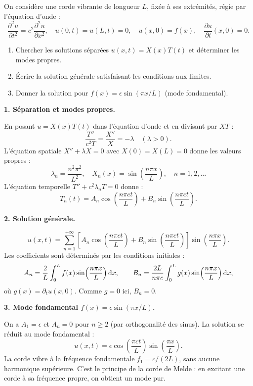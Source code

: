 \documentclass[12pt,a4paper]{article}
\begin{document}
\begin{boiteexercice}
On considère une corde vibrante de longueur $L$, fixée à ses extrémités, régie par l'équation d'onde :
\[
\frac{\partial^2 u}{\partial t^2} = c^2 \frac{\partial^2 u}{\partial x^2}, \quad u(0,t) = u(L,t) = 0, \quad u(x,0) = f(x), \quad \frac{\partial u}{\partial t}(x,0) = 0.
\]
\begin{enumerate}
  \item Chercher les solutions séparées $u(x,t) = X(x)T(t)$ et déterminer les modes propres.
  \item Écrire la solution générale satisfaisant les conditions aux limites.
  \item Donner la solution pour $f(x) = \epsilon\sin(\pi x/L)$ (mode fondamental).
\end{enumerate}
\end{boiteexercice}

\begin{boitecorrige}

\textbf{1. Séparation et modes propres.}

En posant $u = X(x)T(t)$ dans l'équation d'onde et en divisant par $XT$ :
\[
\frac{T''}{c^2 T} = \frac{X''}{X} = -\lambda \quad (\lambda > 0).
\]
L'équation spatiale $X'' + \lambda X = 0$ avec $X(0) = X(L) = 0$ donne les valeurs propres :
\[
\lambda_n = \frac{n^2\pi^2}{L^2}, \quad X_n(x) = \sin\!\left(\frac{n\pi x}{L}\right), \quad n=1,2,\ldots
\]
L'équation temporelle $T'' + c^2\lambda_n T = 0$ donne :
\[
T_n(t) = A_n\cos\!\left(\frac{n\pi c t}{L}\right) + B_n\sin\!\left(\frac{n\pi c t}{L}\right).
\]

\textbf{2. Solution générale.}

\[
u(x,t) = \sum_{n=1}^{+\infty}\!\left[A_n\cos\!\left(\frac{n\pi c t}{L}\right) + B_n\sin\!\left(\frac{n\pi c t}{L}\right)\right]\sin\!\left(\frac{n\pi x}{L}\right).
\]
Les coefficients sont déterminés par les conditions initiales :
\[
A_n = \frac{2}{L}\int_0^L f(x)\sin\!\left(\frac{n\pi x}{L}\right)\mathrm{d} x, \qquad B_n = \frac{2L}{n\pi c}\int_0^L g(x)\sin\!\left(\frac{n\pi x}{L}\right)\mathrm{d} x,
\]
où $g(x) = \partial_t u(x,0)$. Comme $g=0$ ici, $B_n = 0$.

\textbf{3. Mode fondamental $f(x) = \epsilon\sin(\pi x/L)$.}

On a $A_1 = \epsilon$ et $A_n = 0$ pour $n\ge 2$ (par orthogonalité des sinus). La solution se réduit au mode fondamental :
\[
u(x,t) = \epsilon\cos\!\left(\frac{\pi c t}{L}\right)\sin\!\left(\frac{\pi x}{L}\right).
\]
La corde vibre à la fréquence fondamentale $f_1 = c/(2L)$, sans aucune harmonique supérieure. C'est le principe de la corde de Melde : en excitant une corde à sa fréquence propre, on obtient un mode pur.

\end{boitecorrige}
\end{document}
